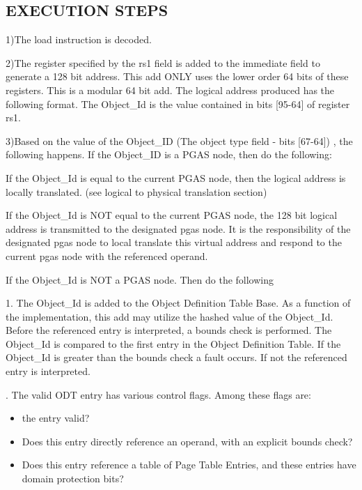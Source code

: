 \documentclass{article}
\begin{document}
\begin{appendices}
\begin{figure}[h]
\end{figure}

 

\pagebreak

\subsection {EXECUTION STEPS}





1)The load instruction is decoded.  


2)The  register  specified by the rs1 field is added to the immediate field to generate a 128 bit address.  This add ONLY uses the lower order 64 bits of these registers.  This is a modular 64 bit add.  The logical address produced has the following format.  The Object\_Id is the value contained in bits [95-64] of register rs1. 


3)Based on the value of the Object\_ID (The object type field -  bits [67-64]) ,  the following happens. If the Object\_ID is  a PGAS node, then do the following:

If the Object\_Id is  equal to the current PGAS node,   then the logical address is locally translated. (see logical to physical translation section)
 
If the Object\_Id is NOT equal to the current PGAS node,  the 128 bit logical address is transmitted to the  designated pgas node.  It is the responsibility of the designated pgas node to local translate this virtual address and respond to the current pgas node with the referenced operand.

If the Object\_Id is NOT a PGAS node.  Then do the following

1.	The Object\_Id is added to the Object Definition Table Base.     As a function of the implementation,  this add may utilize  the hashed value of the Object\_Id.  Before the referenced entry is interpreted,  a bounds check is performed.  The Object\_Id is compared to the first entry in the Object Definition  Table.  If the Object\_Id is greater than the bounds check a fault occurs.  If not the referenced entry is interpreted.

.	The valid ODT entry has various control flags.  Among these flags are:
\begin{itemize}
\item the entry valid?
\item Does this entry directly reference an operand, with an explicit bounds check?
\item Does this entry reference a table of Page Table Entries,  and these entries have domain protection bits? 
\end{itemize}










\end{appendices}
\end{document}
